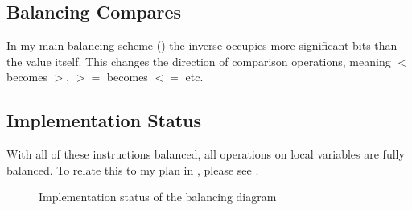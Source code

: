 \subsection{Balancing Compares}
In my main balancing scheme () the inverse occupies more significant bits than the value itself.
This changes the direction of comparison operations, meaning $<$ becomes $>$, $>=$ becomes $<=$ etc.

\subsection{Implementation Status}
With all of these instructions balanced, all operations on local variables are fully balanced.
To relate this to my plan in , please see .

\begin{figure}[h]
  \centering
  \caption{Implementation status of the balancing diagram}
  \label{fig:diagram-implemented}
\end{figure}
